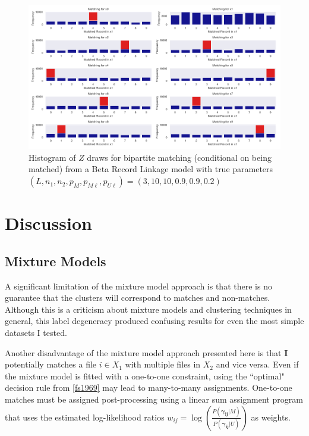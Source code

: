 \documentclass[11pt,reqno]{amsart}
\newcommand\gamij{\mathbf{\gamma_{ij}}}
\begin{document}
\begin{figure}[h!]
\begin{center}
\includegraphics[width=\textwidth]{../Figures/bpm/nM9/ZmatchesnM9_L3_cond.png}
\caption{Histogram of $Z$ draws for bipartite matching (conditional on being matched) from a Beta Record Linkage model with true parameters $(L, n_1, n_2, p_M, p_{M\ell}, p_{U\ell}) = (3, 10, 10, 0.9, 0.9, 0.2)$ }
\label{ZtraceCond}
\end{center}
\end{figure}


\section{Discussion}

\subsection{Mixture Models}

A significant limitation of the mixture model approach is that there is no guarantee that the clusters will correspond to matches and non-matches.  Although this is a criticism about mixture models and clustering techniques in general, this label degeneracy produced confusing results for even the most simple datasets I tested.  

Another disadvantage of the mixture model approach presented here is that $\mathbf{I}$ potentially matches a file $i\in X_1$ with multiple files in $X_2$ and vice versa. Even if the mixture model is fitted with a one-to-one constraint, using the ``optimal" decision rule from \ref{fs1969} may lead to many-to-many assignments.  One-to-one matches must be assigned post-processing using a linear sum assignment program that uses the estimated log-likelihood ratios $w_{ij} = \log \left(\frac{P(\gamij | M)}{P(\gamij | U)}\right)$ as weights.  
\end{document}
